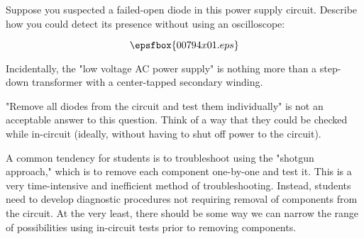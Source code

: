 

Suppose you suspected a failed-open diode in this power supply circuit.  Describe how you could detect its presence without using an oscilloscope:

$$\epsfbox{00794x01.eps}$$

Incidentally, the "low voltage AC power supply" is nothing more than a step-down transformer with a center-tapped secondary winding.







"Remove all diodes from the circuit and test them individually" is not an acceptable answer to this question.  Think of a way that they could be checked while in-circuit (ideally, without having to shut off power to the circuit).







A common tendency for students is to troubleshoot using the "shotgun approach," which is to remove each component one-by-one and test it.  This is a very time-intensive and inefficient method of troubleshooting.  Instead, students need to develop diagnostic procedures not requiring removal of components from the circuit.  At the very least, there should be some way we can narrow the range of possibilities using in-circuit tests prior to removing components.




